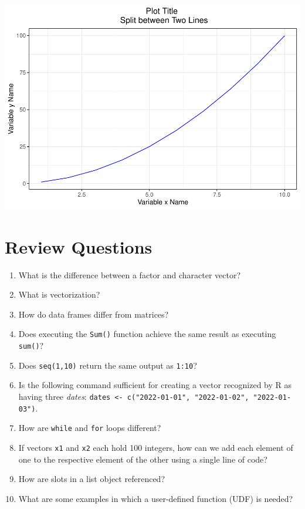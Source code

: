 \documentclass[
]{book}
\begin{document}
\includegraphics{People_Analytics_Lifecycle_files/figure-latex/unnamed-chunk-52-1.pdf}

\hypertarget{review-questions}{%
\section{Review Questions}\label{review-questions}}

\begin{enumerate}
\def\labelenumi{\arabic{enumi}.}
\item
  What is the difference between a factor and character vector?
\item
  What is vectorization?
\item
  How do data frames differ from matrices?
\item
  Does executing the \texttt{Sum()} function achieve the same result as executing \texttt{sum()}?
\item
  Does \texttt{seq(1,10)} return the same output as \texttt{1:10}?
\item
  Is the following command sufficient for creating a vector recognized by R as having three \emph{dates}: \texttt{dates\ \textless{}-\ c("2022-01-01",\ "2022-01-02",\ "2022-01-03")}.
\item
  How are \texttt{while} and \texttt{for} loops different?
\item
  If vectors \texttt{x1} and \texttt{x2} each hold 100 integers, how can we add each element of one to the respective element of the other using a single line of code?
\item
  How are slots in a list object referenced?
\item
  What are some examples in which a user-defined function (UDF) is needed?
\end{enumerate}
\end{document}
